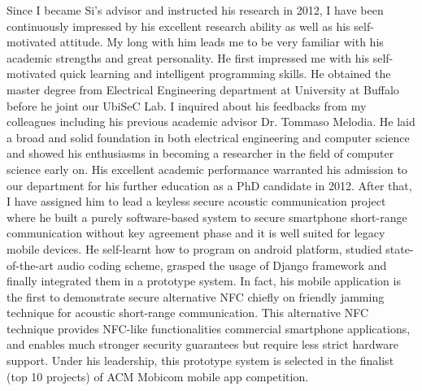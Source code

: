 \documentclass[12pt]{letter} %
\begin{document}
\begin{letter}{}
Since I became Si's advisor and instructed his research in 2012, I have been continuously impressed by his excellent research ability as well as his self-motivated attitude. My long  with him leads me to be very familiar with his academic strengths and great personality.
He first impressed me with his self-motivated quick learning and intelligent programming skills. He obtained the master degree from Electrical Engineering department at University at Buffalo before he joint our UbiSeC Lab. I inquired about his feedbacks from my colleagues including his previous academic advisor Dr. Tommaso Melodia. He laid a broad and solid foundation in both electrical engineering and computer science and showed his enthusiasms in becoming a researcher in the field of computer science early on. His excellent academic performance warranted his admission to our department for his further education as a PhD candidate in 2012. After that, I have assigned him to lead a keyless secure acoustic communication project where he built a purely software-based system to secure smartphone short-range communication without key agreement phase and it is well suited for legacy mobile devices. He self-learnt how to program on android platform, studied state-of-the-art audio coding scheme, grasped the usage of Django framework and finally integrated them in a prototype system. In fact, his mobile application is the first to demonstrate secure alternative NFC chiefly on friendly jamming technique for acoustic short-range communication. This alternative NFC technique provides NFC-like functionalities commercial smartphone applications, and enables much stronger security guarantees but require less strict hardware support. Under his leadership, this prototype system is selected in the finalist (top 10 projects) of ACM Mobicom mobile app competition. 


\end{letter}
\end{document}
